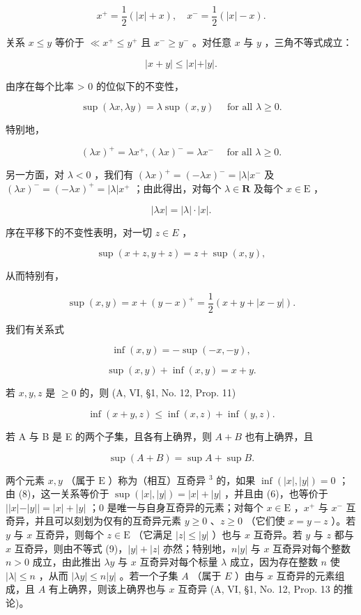 \[
x ^ {+} = \frac {1}{2} (| x | + x), \quad x ^ {-} = \frac {1}{2} (| x | - x).
\]

关系 \(x \leqslant y\) 等价于 \(\ll x^{+} \leqslant y^{+}\) 且 \(x^{-} \geqslant y^{-}\) 。对任意 \(x\) 与 \(y\) ，三角不等式成立：

\[
\vert x + y \vert \leqslant \vert x \vert + \vert y \vert .\tag{1}
\]

由序在每个比率 \textgreater{} 0 的位似下的不变性，

\[
\sup (\lambda x, \lambda y) = \lambda \sup (x, y) \quad \text { for   all } \lambda \geqslant 0.\tag{2}
\]

特别地，

\[
(\lambda x) ^ {+} = \lambda x ^ {+}, (\lambda x) ^ {-} = \lambda x ^ {-} \quad \text { for   all } \lambda \geqslant 0.\tag{3}
\]

另一方面，对 \(\lambda < 0\) ，我们有 \((\lambda x)^{+} = (-\lambda x)^{-} = |\lambda |x^{-}\) 及 \((\lambda x)^{-} = (-\lambda x)^{+} = |\lambda |x^{+}\) ；由此得出，对每个 \(\lambda \in \mathbf{R}\) 及每个 \(x\in \mathrm{E}\) ，

\[
\left| \lambda x \right| = \left| \lambda \right| \cdot \left| x \right|.\tag{4}
\]

序在平移下的不变性表明，对一切 \(z \in E\) ，

\[
\sup (x + z, y + z) = z + \sup (x, y),\tag{5}
\]

从而特别有，

\[
\sup (x, y) = x + (y - x) ^ {+} = \frac {1}{2} (x + y + | x - y |).\tag{6}
\]

我们有关系式

\[
\inf (x, y) = - \sup (- x, - y),\tag{7}
\]

\[
\sup (x, y) + \inf (x, y) = x + y.\tag{8}
\]

若 \(x, y, z\) 是 \(\geqslant 0\) 的，则 (A, VI, §1, No. 12, Prop. 11)

\[
\inf (x + y, z) \leqslant \inf (x, z) + \inf (y, z).\tag{9}
\]

若 A 与 B 是 E 的两个子集，且各有上确界，则 \(A + B\) 也有上确界，且

\[
\sup (A + B) = \sup A + \sup B.\tag{10}
\]

两个元素 \(x, y\) （属于 \(\mathrm{E}\) ）称为（相互）互奇异 \(^3\) 的，如果 \(\inf(|x|, |y|) = 0\) ；由 (8)，这一关系等价于 \(\sup(|x|, |y|) = |x| + |y|\) ，并且由 (6)，也等价于 \(||x| - |y|| = |x| + |y|\) ；0 是唯一与自身互奇异的元素；对每个 \(x \in \mathrm{E}\) ，\(x^+\) 与 \(x^-\) 互奇异，并且可以刻划为仅有的互奇异元素 \(y \geqslant 0\) 、\(z \geqslant 0\) （它们使 \(x = y - z\) ）。若 \(y\) 与 \(x\) 互奇异，则每个 \(z \in \mathrm{E}\) （它满足 \(|z| \leqslant |y|\) ）也与 \(x\) 互奇异。若 \(y\) 与 \(z\) 都与 \(x\) 互奇异，则由不等式 (9)，\(|y| + |z|\) 亦然；特别地，\(n|y|\) 与 \(x\) 互奇异对每个整数 \(n > 0\) 成立，由此推出 \(\lambda y\) 与 \(x\) 互奇异对每个标量 \(\lambda\) 成立，因为存在整数 \(n\) 使 \(|\lambda| \leqslant n\) ，从而 \(|\lambda y| \leqslant n|y|\) 。若一个子集 \(A\) （属于 \(E\) ）由与 \(x\) 互奇异的元素组成，且 \(A\) 有上确界，则该上确界也与 \(x\) 互奇异 (A, VI, §1, No. 12, Prop. 13 的推论)。

